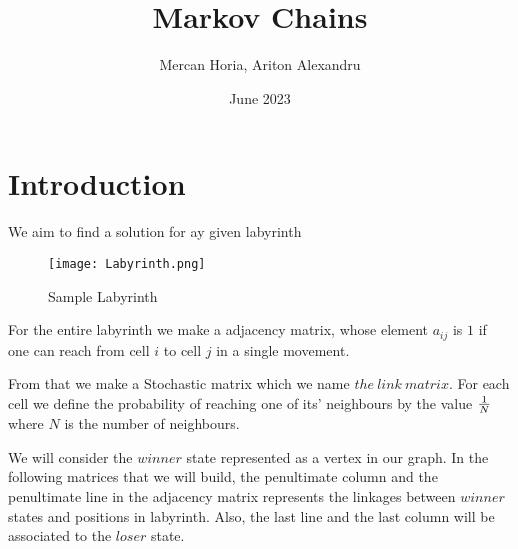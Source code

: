 \documentclass{article}
\title{Markov Chains}
\author{Mercan Horia, Ariton Alexandru}
\date{June 2023}
\begin{document}
\maketitle

\section{Introduction}

We aim to find a solution for ay given labyrinth
\begin{figure}[h]
    \centering
    \texttt{[image: Labyrinth.png]}
    \caption{Sample Labyrinth}
    \label{fig:enter-label}
\end{figure}

For the entire labyrinth we make a adjacency matrix, whose element $a_{ij}$ is $1$ if one can reach from cell $i$ to cell $j$ in a single movement.

From that we make a Stochastic matrix which we name $the\ link\ matrix$. For each cell we define the probability of reaching one of its' neighbours by the value $1 \over N$ where $N$ is the number of neighbours.

We will consider the $winner$ state represented as a vertex in our graph. In the following matrices that we will build, the penultimate column and the penultimate line in the adjacency matrix represents the linkages between $winner$ states and positions in labyrinth. Also, the last line and the last column will be associated to the $loser$ state.
\end{document}
